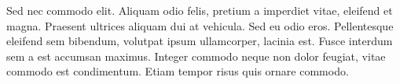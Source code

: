 \documentclass[]{article}
\begin{document}
Sed nec commodo elit. Aliquam odio felis, pretium a imperdiet vitae, eleifend et magna. Praesent ultrices aliquam dui at vehicula. Sed eu odio eros. Pellentesque eleifend sem bibendum, volutpat ipsum ullamcorper, lacinia est. Fusce interdum sem a est accumsan maximus. Integer commodo neque non dolor feugiat, vitae commodo est condimentum. Etiam tempor risus quis ornare commodo.

\tableofcontents
\end{document}
